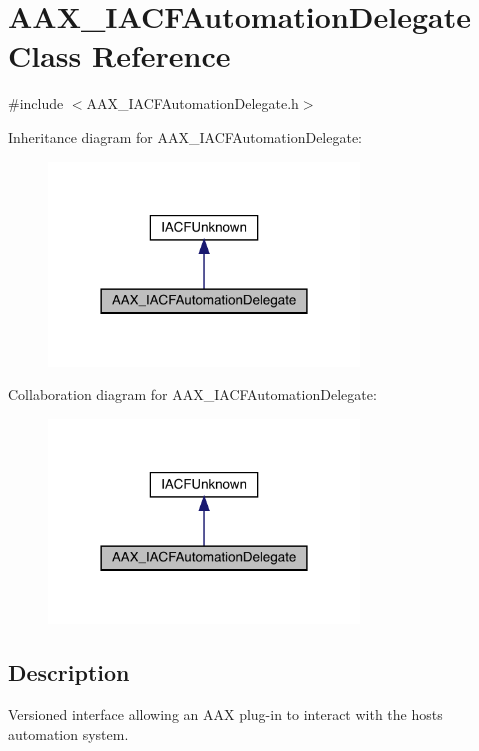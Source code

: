 \hypertarget{a01617}{}\section{A\+A\+X\+\_\+\+I\+A\+C\+F\+Automation\+Delegate Class Reference}
\label{a01617}


{\ttfamily \#include $<$A\+A\+X\+\_\+\+I\+A\+C\+F\+Automation\+Delegate.\+h$>$}



Inheritance diagram for A\+A\+X\+\_\+\+I\+A\+C\+F\+Automation\+Delegate\+:
\nopagebreak
\begin{figure}[H]
\begin{center}
\leavevmode
\includegraphics[width=234pt]{a01616}
\end{center}
\end{figure}


Collaboration diagram for A\+A\+X\+\_\+\+I\+A\+C\+F\+Automation\+Delegate\+:
\nopagebreak
\begin{figure}[H]
\begin{center}
\leavevmode
\includegraphics[width=234pt]{a01615}
\end{center}
\end{figure}


\subsection{Description}
Versioned interface allowing an A\+AX plug-\/in to interact with the host\textquotesingle{}s automation system. 

